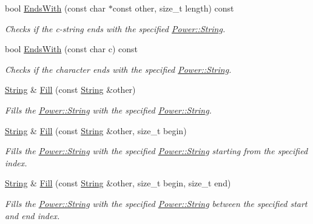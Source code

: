 \begin{DoxyCompactItemize}
bool \hyperlink{class_power_1_1_string_a7e5527a7258c8e83f19cc5a353a203b9}{Ends\+With} (const char $\ast$const other, size\+\_\+t length) const
\begin{DoxyCompactList}\small\item\em Checks if the c-\/string ends with the specified \hyperlink{class_power_1_1_string}{Power\+::\+String}. \end{DoxyCompactList}\item 
bool \hyperlink{class_power_1_1_string_a8f4b32bad7099116f14259d2bd0c4004}{Ends\+With} (const char c) const
\begin{DoxyCompactList}\small\item\em Checks if the character ends with the specified \hyperlink{class_power_1_1_string}{Power\+::\+String}. \end{DoxyCompactList}\item 
\hyperlink{class_power_1_1_string}{String} \& \hyperlink{class_power_1_1_string_afcc55f4fa85bbde268d180fd3c515dac}{Fill} (const \hyperlink{class_power_1_1_string}{String} \&other)
\begin{DoxyCompactList}\small\item\em Fills the \hyperlink{class_power_1_1_string}{Power\+::\+String} with the specified \hyperlink{class_power_1_1_string}{Power\+::\+String}. \end{DoxyCompactList}\item 
\hyperlink{class_power_1_1_string}{String} \& \hyperlink{class_power_1_1_string_a9f82a188fdb2c48185075dd778a1a048}{Fill} (const \hyperlink{class_power_1_1_string}{String} \&other, size\+\_\+t begin)
\begin{DoxyCompactList}\small\item\em Fills the \hyperlink{class_power_1_1_string}{Power\+::\+String} with the specified \hyperlink{class_power_1_1_string}{Power\+::\+String} starting from the specified index. \end{DoxyCompactList}\item 
\hyperlink{class_power_1_1_string}{String} \& \hyperlink{class_power_1_1_string_a5baac2af41bfe9f62f856bc2edc887f9}{Fill} (const \hyperlink{class_power_1_1_string}{String} \&other, size\+\_\+t begin, size\+\_\+t end)
\begin{DoxyCompactList}\small\item\em Fills the \hyperlink{class_power_1_1_string}{Power\+::\+String} with the specified \hyperlink{class_power_1_1_string}{Power\+::\+String} between the specified start and end index. \end{DoxyCompactList}\item 

\end{DoxyCompactItemize}
